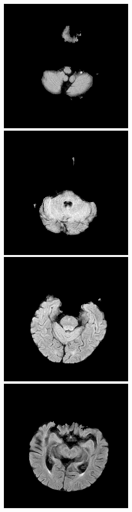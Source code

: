 \documentclass[conference]{IEEEtran}
\begin{document}
\includegraphics[scale = 0.2]{stripped_0.png}
\includegraphics[scale = 0.2]{stripped_4.png}
\includegraphics[scale = 0.2]{stripped_6.png}
\includegraphics[scale = 0.2]{stripped_9.png}
\end{document}
